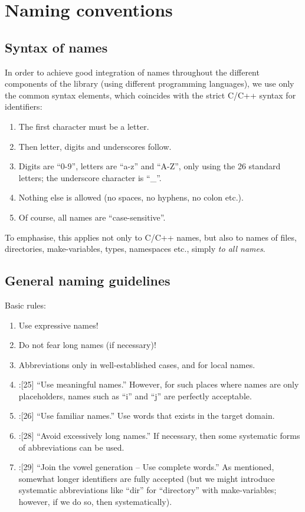 \documentclass{book}
\begin{document}
\chapter{Naming conventions}
\label{cha:Naming}



\section{Syntax of names}
\label{sec:Syntaxnames}

In order to achieve good integration of names throughout the different components of the library (using different programming languages), we use only the common syntax elements, which coincides with the strict C/C++ syntax for identifiers:
\begin{enumerate}
\item The first character must be a letter.
\item Then letter, digits and underscores follow.
\item Digits are ``0-9'', letters are ``a-z'' and ``A-Z'', only using the 26 standard letters; the underscore character is ``\_''.
\item Nothing else is allowed (no spaces, no hyphens, no colon etc.).
\item Of course, all names are ``case-sensitive''.
\end{enumerate}
To emphasise, this applies not only to C/C++ names, but also to names of files, directories, make-variables, types, namespaces etc., simply \emph{to all names}.




\section{General naming guidelines}
\label{sec:GenNaming}

Basic rules:
\begin{enumerate}
\item Use expressive names!
\item Do not fear long names (if necessary)!
\item Abbreviations only in well-established cases, and for local names.
\item \cite{OKL_MisfeldtBumgardnerGray2004CppStyle}:[25] ``Use meaningful names.'' However, for such places where names are only placeholders, names such as ``i'' and ``j'' are perfectly acceptable.
\item \cite{OKL_MisfeldtBumgardnerGray2004CppStyle}:[26] ``Use familiar names.'' Use words that exists in the target domain.
\item \cite{OKL_MisfeldtBumgardnerGray2004CppStyle}:[28] ``Avoid excessively long names.'' If necessary, then some systematic forms of abbreviations can be used.
\item \cite{OKL_MisfeldtBumgardnerGray2004CppStyle}:[29] ``Join the vowel generation -- Use complete words.'' As mentioned, somewhat longer identifiers are fully accepted (but we might introduce systematic abbreviations like ``dir'' for ``directory'' with make-variables; however, if we do so, then systematically).
\end{enumerate}
\end{document}
